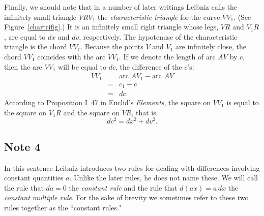 \documentclass[twoside,openright]{article}
\begin{document}
Finally, we should note that in a number of later writings Leibniz
calls the infinitely small triangle $VRV_1$ the {\em characteristic
  triangle}\label{chartri} for the curve $VV_1$.  (See
Figure~\ref{chartrifig}.) It is an infinitely small right triangle
whose legs, $VR$ and $V_1R$, are equal to $dx$ and $dv$, respectively.
The hypotenuse of the characteristic triangle is the chord $VV_1$.
Because the points $V$ and $V_1$ are infinitely close, the chord
$VV_1$ coincides with the arc $VV_1$.  If we denote the length of arc
$AV$ by $c$, then the arc $VV_1$ will be equal to $dc$, the difference
of the $c$'s:
\begin{eqnarray*}
VV_1 & = &\mbox{arc }AV_1 - \mbox{arc }AV\\
& = & c_1 - c\\
& = & dc.
\end{eqnarray*}
According to Proposition I~47 in Euclid's {\em Elements}, the square
on $VV_1$ is equal to the square on $V_1R$ and the square on $VR$,
that is
$$dc^2 = dx^2 + dv^2.$$



\subsection*{Note 4}
\label{cnm4}

In this sentence Leibniz introduces two rules for dealing with
differences involving constant quantities $a$.  Unlike the later
rules, he does not name these.  We will call the rule that $da =0$ the
{\em constant rule} and the rule that $d(ax) = a\,dx$ the {\em
  constant multiple rule}.  For the sake of brevity we sometimes refer
to these two rules together as the ``constant rules."
\end{document}
